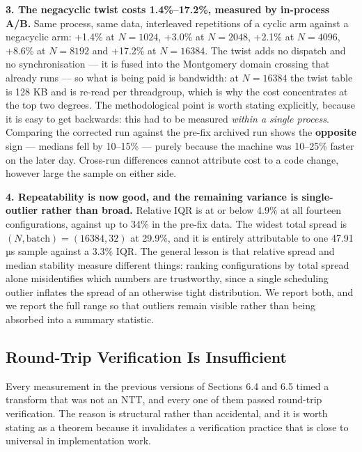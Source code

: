 \textbf{3. The negacyclic twist costs 1.4\%--17.2\%, measured by in-process A/B.} Same process, same data, interleaved repetitions of a cyclic arm against a negacyclic arm: +1.4\% at \(N = 1024\), +3.0\% at \(N = 2048\), +2.1\% at \(N = 4096\), +8.6\% at \(N = 8192\) and +17.2\% at \(N = 16384\). The twist adds no dispatch and no synchronisation --- it is fused into the Montgomery domain crossing that already runs --- so what is being paid is bandwidth: at \(N = 16384\) the twist table is 128 KB and is re-read per threadgroup, which is why the cost concentrates at the top two degrees. The methodological point is worth stating explicitly, because it is easy to get backwards: this had to be measured \emph{within a single process}. Comparing the corrected run against the pre-fix archived run shows the \textbf{opposite} sign --- medians fell by 10--15\% --- purely because the machine was 10--25\% faster on the later day. Cross-run differences cannot attribute cost to a code change, however large the sample on either side.

\textbf{4. Repeatability is now good, and the remaining variance is single-outlier rather than broad.} Relative IQR is at or below 4.9\% at all fourteen configurations, against up to 34\% in the pre-fix data. The widest total spread is \((N, \text{batch}) = (16384, 32)\) at 29.9\%, and it is entirely attributable to one 47.91 µs sample against a 3.3\% IQR. The general lesson is that relative spread and median stability measure different things: ranking configurations by total spread alone misidentifies which numbers are trustworthy, since a single scheduling outlier inflates the spread of an otherwise tight distribution. We report both, and we report the full range so that outliers remain visible rather than being absorbed into a summary statistic.

\subsection{Round-Trip Verification Is Insufficient}\label{round-trip-verification-is-insufficient}

Every measurement in the previous versions of Sections 6.4 and 6.5 timed a transform that was not an NTT, and every one of them passed round-trip verification. The reason is structural rather than accidental, and it is worth stating as a theorem because it invalidates a verification practice that is close to universal in implementation work.

